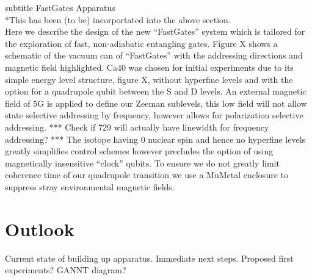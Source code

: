 \documentclass[12pt]{iopart}
\begin{document}
subtitle FastGates Apparatus\\
*This has been (to be) incorportated into the above section. \\

Here we describe the design of the new ``FastGates'' system which is
tailored for the exploration of fast, non-adiabatic entangling
gates. Figure X shows a schematic of the vacuum can of ``FastGates''
with the addressing directions and magnetic field highlighted. Ca40
was chosen for initial experiments due to its simple energy level
structure, figure X, without hyperfine levels and with the option for
a quadrupole qubit between the S and D levels. An external magnetic
field of 5G is applied to define our Zeeman sublevels, this low field
will not allow state selective addressing by frequency, however allows
for polarization selective addressing. *** Check if 729 will actually
have linewidth for frequency addressing? *** The isotope having 0
nuclear spin and hence no hyperfine levels greatly simplifies control
schemes however precludes the option of using magnetically insensitive
``clock'' qubits. To ensure we do not greatly limit coherence time of
our quadrupole transition we use a MuMetal enclosure to suppress stray
environmental magnetic fields.



\section{Outlook}
    Current state of building up apparatus.
    Immediate next steps.
    Proposed first experiments?
    GANNT diagram?

  
\end{document}

